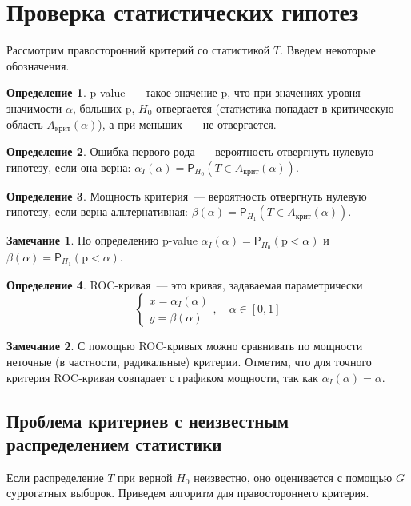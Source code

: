 \documentclass[specialist,
substylefile = spbu_report.rtx,
subf,href,colorlinks=true, 12pt]{disser}
\theoremstyle{definition}
\newtheorem{definition}{Определение}
\newtheorem{remark}{Замечание}
\begin{document}
\section{Проверка статистических гипотез}\label{sect:hypothesis}
Рассмотрим правосторонний критерий со статистикой $T$. Введем некоторые обозначения.
\begin{definition}
	p-value~--- такое значение $\mathrm p$, что при значениях уровня значимости $\alpha$, больших $\mathrm p$, $H_0$ отвергается (статистика попадает в критическую область $A_\text{крит}(\alpha)$), а при меньших~--- не отвергается.
\end{definition}
\begin{definition}
	Ошибка первого рода~--- вероятность отвергнуть нулевую гипотезу, если она верна: $\alpha_I(\alpha)=\mathsf P_{H_0}(T\in A_\text{крит}(\alpha))$.
\end{definition}
\begin{definition}
	Мощность критерия~--- вероятность отвергнуть нулевую гипотезу, если верна альтернативная: $\beta(\alpha)=\mathsf P_{H_1}(T\in A_\text{крит}(\alpha))$.
\end{definition}
\begin{remark}
	По определению p-value $\alpha_I(\alpha)=\mathsf P_{H_0}(\mathrm p < \alpha)$ и $\beta(\alpha)=\mathsf P_{H_1}(\mathrm p < \alpha)$.
\end{remark}
\begin{definition}
	ROC-кривая~--- это кривая, задаваемая параметрически
	\[
		\begin{cases}
			x=\alpha_I(\alpha) \\
			y=\beta(\alpha)
		\end{cases},\quad \alpha\in[0,1]
	\]
\end{definition}
\begin{remark}
	С помощью ROC-кривых можно сравнивать по мощности неточные (в частности, радикальные) критерии. Отметим, что для точного критерия ROC-кривая совпадает с графиком мощности, так как $\alpha_I(\alpha)=\alpha$.
\end{remark}

\subsection{Проблема критериев с неизвестным распределением статистики}\label{sect:problem}
Если распределение $T$ при верной $H_0$ неизвестно, оно оценивается с помощью $G$ суррогатных выборок. Приведем алгоритм для правостороннего критерия.
\end{document}
